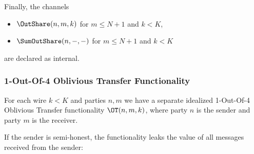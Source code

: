 Finally, the channels
\begin{itemize}
\item $\OutShare(n,m,k)$ for $m \leq N+1$ and $k < K$,
\item $\SumOutShare(n,-,-)$ for $m \leq N+1$ and $k < K$
\end{itemize}
are declared as internal.

\subsubsection{1-Out-Of-4 Oblivious Transfer Functionality}
For each wire $k < K$ and parties $n,m$ we have a separate idealized 1-Out-Of-4 Oblivious Transfer functionality $\OT(n,m,k)$, where party $n$ is the sender and party $m$ is the receiver.\smallskip

\noindent If the sender is semi-honest, the functionality leaks the value of all messages received from the sender:
